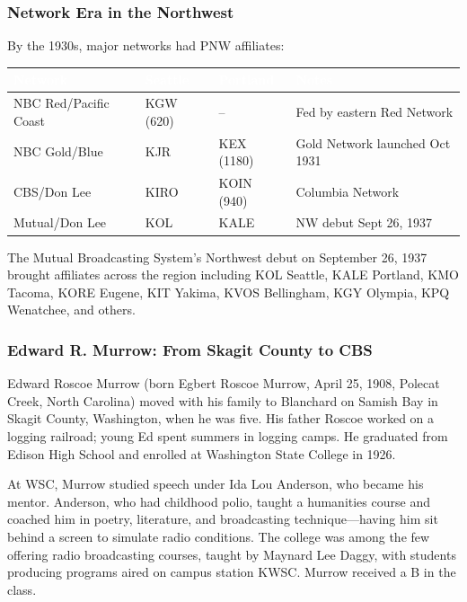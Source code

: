\documentclass[11pt,letterpaper]{article}
\newcommand{\tableheader}[1]{\textbf{\sffamily\textcolor{white}{#1}}}
\begin{document}
\subsubsection{Network Era in the Northwest}

By the 1930s, major networks had PNW affiliates:

\begin{center}
\begin{tabularx}{\textwidth}{L{2.5cm}L{2cm}L{2cm}X}
\toprule
{}
\tableheader{Network} & \tableheader{Seattle} & \tableheader{Portland} & \tableheader{Notes} \\
\midrule
NBC Red/Pacific Coast & KGW (620) & -- & Fed by eastern Red Network \\
NBC Gold/Blue & KJR & KEX (1180) & Gold Network launched Oct 1931 \\
CBS/Don Lee & KIRO & KOIN (940) & Columbia Network \\
Mutual/Don Lee & KOL & KALE & NW debut Sept 26, 1937 \\
\bottomrule
\end{tabularx}
\end{center}

The Mutual Broadcasting System's Northwest debut on September 26, 1937 brought affiliates across the region including KOL Seattle, KALE Portland, KMO Tacoma, KORE Eugene, KIT Yakima, KVOS Bellingham, KGY Olympia, KPQ Wenatchee, and others.

\subsubsection{Edward R. Murrow: From Skagit County to CBS}

Edward Roscoe Murrow (born Egbert Roscoe Murrow, April 25, 1908, Polecat Creek, North Carolina) moved with his family to Blanchard on Samish Bay in Skagit County, Washington, when he was five. His father Roscoe worked on a logging railroad; young Ed spent summers in logging camps. He graduated from Edison High School and enrolled at Washington State College in 1926.

At WSC, Murrow studied speech under Ida Lou Anderson, who became his mentor. Anderson, who had childhood polio, taught a humanities course and coached him in poetry, literature, and broadcasting technique---having him sit behind a screen to simulate radio conditions. The college was among the few offering radio broadcasting courses, taught by Maynard Lee Daggy, with students producing programs aired on campus station KWSC. Murrow received a B in the class.
\end{document}
